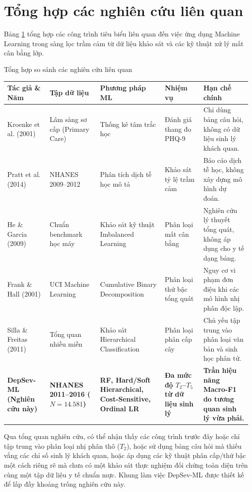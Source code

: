 \section{Tổng hợp các nghiên cứu liên quan}
\label{sec:nghien-cuu-lien-quan}

Bảng \ref{tab:related-works} tổng hợp các công trình tiêu biểu liên quan đến việc ứng dụng Machine Learning trong sàng lọc trầm cảm từ dữ liệu khảo sát và các kỹ thuật xử lý mất cân bằng lớp.

\begin{table}{Tổng hợp so sánh các nghiên cứu liên quan}
\centering
\small
\label{tab:related-works}
\begin{tabularx}{\textwidth}{p{3.2cm} p{2.8cm} p{3.2cm} p{2.5cm} X}
\toprule
\textbf{Tác giả \& Năm} & \textbf{Tập dữ liệu} & \textbf{Phương pháp ML} & \textbf{Nhiệm vụ} & \textbf{Hạn chế chính} \\
\midrule
Kroenke et al. (2001) \cite{kroenke2001phq} & Lâm sàng sơ cấp (Primary Care) & Thống kê tâm trắc học & Đánh giá thang đo PHQ-9 & Chỉ dùng bảng câu hỏi, không có dữ liệu sinh lý khách quan. \\
\addlinespace
Pratt et al. (2014) \cite{pratt1991discriminant} & NHANES 2009--2012 & Phân tích dịch tễ học mô tả & Khảo sát tỷ lệ trầm cảm & Báo cáo dịch tễ học, không xây dựng mô hình dự đoán. \\
\addlinespace
He \& Garcia (2009) \cite{he2009learning} & Chuẩn benchmark học máy & Khảo sát kỹ thuật Imbalanced Learning & Phân loại mất cân bằng & Nghiên cứu lý thuyết tổng quát, không áp dụng cho y tế dạng bảng. \\
\addlinespace
Frank \& Hall (2001) \cite{frank2001simple} & UCI Machine Learning & Cumulative Binary Decomposition & Phân loại thứ bậc tổng quát & Nguy cơ vi phạm đơn điệu khi các mô hình nhị phân độc lập. \\
\addlinespace
Silla \& Freitas (2011) \cite{silla2011survey} & Tổng quan nhiều miền & Khảo sát Hierarchical Classification & Phân loại phân cấp cây & Chủ yếu tập trung vào phân loại văn bản và sinh học phân tử. \\
\addlinespace
\textbf{DepSev-ML (Nghiên cứu này)} & \textbf{NHANES 2011--2016 ($N=14.581$)} & \textbf{RF, Hard/Soft Hierarchical, Cost-Sensitive, Ordinal LR} & \textbf{Đa mức độ $T_2$--$T_5$ từ dữ liệu sinh lý} & \textbf{Trần hiệu năng Macro-F1 do tương quan sinh lý vừa phải.} \\
\bottomrule
\end{tabularx}
\end{table}

Qua tổng quan nghiên cứu, có thể nhận thấy các công trình trước đây hoặc chỉ tập trung vào phân loại nhị phân thô ($T_2$), hoặc sử dụng bảng câu hỏi mà thiếu vắng các chỉ số sinh lý khách quan, hoặc áp dụng các kỹ thuật phân cấp/thứ bậc một cách riêng rẽ mà chưa có một khảo sát thực nghiệm đối chứng toàn diện trên cùng một tập dữ liệu y tế chuẩn mực. Khung làm việc DepSev-ML được thiết kế để lấp đầy khoảng trống nghiên cứu này.
\cleardoublepage

